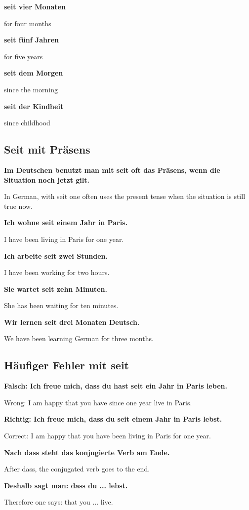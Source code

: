 \documentclass[a4paper]{article}
\newcommand{\EN}[1]{\par{\small\textcolor{TranslationGray}{#1}}\vspace{0.4em}}
\begin{document}
            \textbf{seit vier Monaten}
            \EN{for four months}
            
            \textbf{seit fünf Jahren}
            \EN{for five years}
            
            \textbf{seit dem Morgen}
            \EN{since the morning}
            
            \textbf{seit der Kindheit}
            \EN{since childhood}
        
        \subsection{Seit mit Präsens}
            
            \textbf{Im Deutschen benutzt man mit seit oft das Präsens, wenn die Situation noch jetzt gilt.}
            \EN{In German, with seit one often uses the present tense when the situation is still true now.}
            
            \textbf{Ich wohne seit einem Jahr in Paris.}
            \EN{I have been living in Paris for one year.}
            
            \textbf{Ich arbeite seit zwei Stunden.}
            \EN{I have been working for two hours.}
            
            \textbf{Sie wartet seit zehn Minuten.}
            \EN{She has been waiting for ten minutes.}
            
            \textbf{Wir lernen seit drei Monaten Deutsch.}
            \EN{We have been learning German for three months.}
        
        \subsection{Häufiger Fehler mit seit}
            
            \textbf{Falsch: Ich freue mich, dass du hast seit ein Jahr in Paris leben.}
            \EN{Wrong: I am happy that you have since one year live in Paris.}
            
            \textbf{Richtig: Ich freue mich, dass du seit einem Jahr in Paris lebst.}
            \EN{Correct: I am happy that you have been living in Paris for one year.}
            
            \textbf{Nach dass steht das konjugierte Verb am Ende.}
            \EN{After dass, the conjugated verb goes to the end.}
            
            \textbf{Deshalb sagt man: dass du ... lebst.}
            \EN{Therefore one says: that you ... live.}
            
\end{document}
